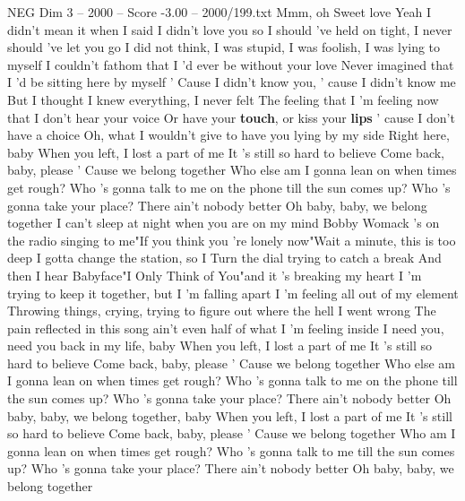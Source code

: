\begin{textsample}{NEG Dim 3 – 2000 – Score -3.00 – 2000/199.txt}  \label{ex:f3_neg_001}
Mmm, oh Sweet love Yeah I didn't mean it when I said I didn't love you so I should 've held on tight, I never should 've let you go I did not think, I was stupid, I was foolish, I was lying to myself I couldn't fathom that I 'd ever be without your love Never imagined that I 'd be sitting here by myself ' Cause I didn't know you, ' cause I didn't know me But I thought I knew everything, I never felt The feeling that I 'm feeling now that I don't hear your voice Or have your \textbf{touch}, or kiss your \textbf{lips} ' cause I don't have a choice Oh, what I wouldn't give to have you lying by my side Right here, baby When you left, I lost a part of me It 's still so hard to believe Come back, baby, please ' Cause we belong together Who else am I gonna lean on when times get rough?
Who 's gonna talk to me on the phone till the sun comes up?
Who 's gonna take your place?
There ain't nobody better Oh baby, baby, we belong together I can't sleep at night when you are on my mind Bobby Womack 's on the radio singing to me"If you think you 're lonely now"Wait a minute, this is too deep I gotta change the station, so I Turn the dial trying to catch a break And then I hear Babyface"I Only Think of You"and it 's breaking my heart I 'm trying to keep it together, but I 'm falling apart I 'm feeling all out of my element Throwing things, crying, trying to figure out where the hell I went wrong The pain reflected in this song ain't even half of what I 'm feeling inside I need you, need you back in my life, baby When you left, I lost a part of me It 's still so hard to believe Come back, baby, please ' Cause we belong together Who else am I gonna lean on when times get rough?
Who 's gonna talk to me on the phone till the sun comes up?
Who 's gonna take your place?
There ain't nobody better Oh baby, baby, we belong together, baby When you left, I lost a part of me It 's still so hard to believe Come back, baby, please ' Cause we belong together Who am I gonna lean on when times get rough?
Who 's gonna talk to me till the sun comes up?
Who 's gonna take your place?
There ain't nobody better Oh baby, baby, we belong together

\end{textsample}
